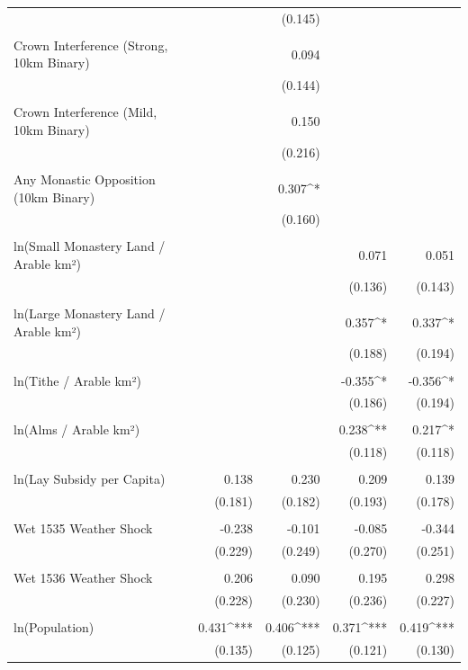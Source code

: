 \begin{table}[H]
\begin{tabular}{@{\extracolsep{.5pt}}lD{.}{.}{-3} D{.}{.}{-3} D{.}{.}{-3} D{.}{.}{-3} }
  &  & (0.145) &  &  \\ 
  & & & & \\ 
 Crown Interference (Strong, 10km Binary) &  & 0.094 &  &  \\ 
  &  & (0.144) &  &  \\ 
  & & & & \\ 
 Crown Interference (Mild, 10km Binary) &  & 0.150 &  &  \\ 
  &  & (0.216) &  &  \\ 
  & & & & \\ 
 Any Monastic Opposition (10km Binary) &  & 0.307^{*} &  &  \\ 
  &  & (0.160) &  &  \\ 
  & & & & \\ 
 ln(Small Monastery Land / Arable km²) &  &  & 0.071 & 0.051 \\ 
  &  &  & (0.136) & (0.143) \\ 
  & & & & \\ 
 ln(Large Monastery Land / Arable km²) &  &  & 0.357^{*} & 0.337^{*} \\ 
  &  &  & (0.188) & (0.194) \\ 
  & & & & \\ 
 ln(Tithe / Arable km²) &  &  & -0.355^{*} & -0.356^{*} \\ 
  &  &  & (0.186) & (0.194) \\ 
  & & & & \\ 
 ln(Alms / Arable km²) &  &  & 0.238^{**} & 0.217^{*} \\ 
  &  &  & (0.118) & (0.118) \\ 
  & & & & \\ 
 ln(Lay Subsidy per Capita) & 0.138 & 0.230 & 0.209 & 0.139 \\ 
  & (0.181) & (0.182) & (0.193) & (0.178) \\ 
  & & & & \\ 
 Wet 1535 Weather Shock & -0.238 & -0.101 & -0.085 & -0.344 \\ 
  & (0.229) & (0.249) & (0.270) & (0.251) \\ 
  & & & & \\ 
 Wet 1536 Weather Shock & 0.206 & 0.090 & 0.195 & 0.298 \\ 
  & (0.228) & (0.230) & (0.236) & (0.227) \\ 
  & & & & \\ 
 ln(Population) & 0.431^{***} & 0.406^{***} & 0.371^{***} & 0.419^{***} \\ 
  & (0.135) & (0.125) & (0.121) & (0.130) \\ 

\end{tabular}
\end{table}
